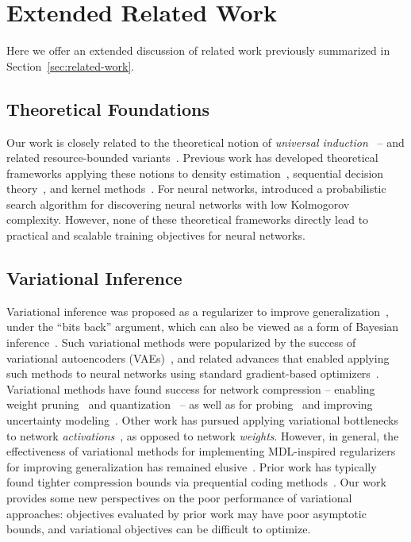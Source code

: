 
\section{Extended Related Work}
\label{sec:extended-related-work}

Here we offer an extended discussion of related work previously summarized in Section~\ref{sec:related-work}.

\subsection{Theoretical Foundations} Our work is closely related to the theoretical notion of \emph{universal induction}~\citep{solomonoff1964formal,hutter2000theory,lattimore2013no,achille2021information} -- and related resource-bounded variants~\citep{levin1973universal,nakkiran2021turing}. Previous work has developed theoretical frameworks applying these notions to density estimation~\citep{barron1985logically,barron1991minimum}, sequential decision theory~\citep{hutter2005universal}, and kernel methods~\citep{hamzi2024bridging}.  For neural networks, \citet{schmidhuber1997discovering} introduced a probabilistic search algorithm for discovering neural networks with low Kolmogorov complexity. However, none of these theoretical frameworks directly lead to practical and scalable training objectives for neural networks.

\subsection{Variational Inference}
 Variational inference was proposed as a regularizer to improve generalization~\citep{hinton1993keeping}, under the ``bits back'' argument, which can also be viewed as a form of Bayesian inference~\citep{honkela2004variational}. 
Such variational methods were popularized by the success of variational autoencoders (VAEs)~\citep{kingma2014auto}, and related advances that enabled applying such methods to neural networks using standard gradient-based optimizers~\citep{graves2011practical,blundell2015weight}. Variational methods have found success for network compression -- enabling weight pruning~\citep{louizos2017bayesian} and quantization~\citep{achterhold2018variational,ullrich2017soft} -- as well as for probing~\citep{voita2020information} and improving uncertainty modeling~\citep{sankararaman2022bayesformer,gal2016dropout}. Other work has pursued applying variational bottlenecks to network \emph{activations}~\citep{fehr2024nonparametric}, as opposed to network \emph{weights}.
However, in general, the effectiveness of variational methods for implementing MDL-inspired regularizers for improving generalization has remained elusive~\citep{blier2018description,cinquin2021pathologies}. Prior work has typically found tighter compression bounds via prequential coding methods~\citep{blier2018description,bornschein2023sequential}. Our work provides some new perspectives on the poor performance of variational approaches: objectives evaluated by prior work may have poor asymptotic bounds, and variational objectives can be difficult to optimize. 

